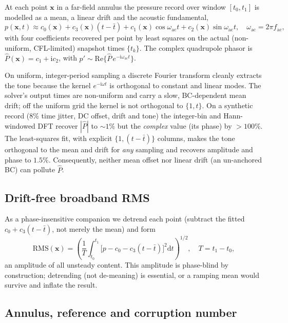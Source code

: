 \documentclass{jfm}
\newcommand{\dd}{\mathrm{d}}
\newcommand{\xv}{\bm{x}}
\begin{document}
At each point $\xv$ in a far-field annulus the pressure record over window $[t_0,t_1]$
is modelled as a mean, a linear drift and the acoustic fundamental,
\begin{equation}
p(\xv,t)\approx c_0(\xv)+c_3(\xv)(t-\bar t)
+c_1(\xv)\cos\omega_{\mathrm{ac}}t+c_2(\xv)\sin\omega_{\mathrm{ac}}t,
\quad\omega_{\mathrm{ac}}=2\pi f_{\mathrm{ac}},
\end{equation}
with four coefficients recovered per point by least squares on the actual (non-uniform,
CFL-limited) snapshot times $\{t_k\}$. The complex quadrupole phasor is
$\hat P(\xv)=c_1+\mathrm{i}c_2$, with $p'\sim\mathrm{Re}\{\hat P\,e^{-\mathrm{i}\omega_{\mathrm{ac}}t}\}$.

On uniform, integer-period sampling a discrete Fourier transform cleanly extracts the tone
because the kernel $e^{-\mathrm{i}\omega t}$ is orthogonal to constant and linear modes. The
solver's output times are non-uniform and carry a slow, BC-dependent mean drift; off the
uniform grid the kernel is not orthogonal to $\{1,t\}$. On a synthetic record (8\% time
jitter, DC offset, drift and tone) the integer-bin and Hann-windowed DFT recover $|\hat P|$
to $\sim1\%$ but the \emph{complex} value (its phase) by $>100\%$. The least-squares fit,
with explicit $\{1,(t-\bar t)\}$ columns, makes the tone orthogonal to the mean and drift for
\emph{any} sampling and recovers amplitude and phase to $1.5\%$. Consequently, neither mean
offset nor linear drift (an un-anchored BC) can pollute $\hat P$.

\subsection{Drift-free broadband RMS}

As a phase-insensitive companion we detrend each point (subtract the fitted $c_0+c_3(t-\bar t)$,
not merely the mean) and form
\begin{equation}
\mathrm{RMS}(\xv)=\left(\frac1T\int_{t_0}^{t_1}
\big[p-c_0-c_3(t-\bar t)\big]^2\dd t\right)^{1/2},\quad T=t_1-t_0,
\end{equation}
an amplitude of all unsteady content. This amplitude is phase-blind by construction;
detrending (not de-meaning) is essential, or a ramping mean would survive and inflate the result.

\subsection{Annulus, reference and corruption number}
\end{document}
